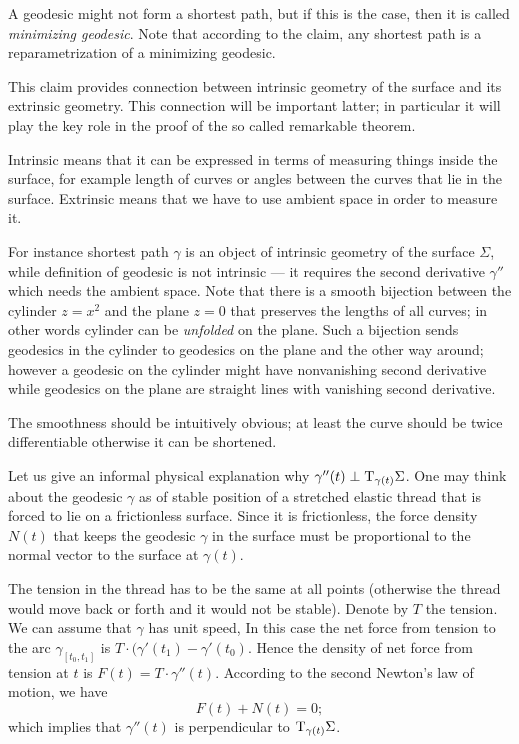 A geodesic might not form a shortest path, but if this is the case, then it is called \emph{minimizing geodesic}.
Note that according to the claim, any shortest path is a reparametrization of a minimizing geodesic.

This claim provides connection between intrinsic geometry of the surface and its extrinsic geometry.
This connection will be important latter; in particular it will play the key role in the proof of the so called remarkable theorem. %

Intrinsic means that it can be expressed in terms of measuring things inside the surface, for example length of curves or angles between the curves that lie in the surface.
Extrinsic means that we have to use ambient space in order to measure it.

For instance shortest path $\gamma$ is an object of intrinsic geometry of the surface $\Sigma$,
while definition of geodesic is not intrinsic --- it requires the second derivative $\gamma''$ which needs the ambient space.
Note that there is a smooth bijection between the cylinder $z=x^2$ and the plane $z=0$ that preserves the lengths of all curves; in other words cylinder can be \emph{unfolded} on the plane.
Such a bijection sends geodesics in the cylinder to geodesics on the plane and the other way around; however a geodesic on the cylinder might have nonvanishing second derivative while geodesics on the plane are straight lines with vanishing second derivative.



The smoothness should be intuitively obvious; at least the curve should be twice differentiable otherwise it can be shortened.

Let us give an informal physical explanation why $\gamma''(t)\perp\mathrm{T}_{\gamma(t)}\Sigma$.
One may think about the geodesic $\gamma$ as of stable position of a stretched elastic thread that is forced to lie on a frictionless surface.
Since it is frictionless, the force density $N(t)$ that keeps the geodesic $\gamma$ in the surface must be proportional to the normal vector to the surface at $\gamma(t)$.

The tension in the thread has to be the same at all points (otherwise the thread would move back or forth and it would not be stable).
Denote by $T$ the tension.
We can assume that $\gamma$ has unit speed,
In this case the net force from tension to the arc $\gamma_{[t_0,t_1]}$ is $T\cdot(\gamma'(t_1)-\gamma'(t_0)$.
Hence the density of net force from tension at $t$ is $F(t)=T\cdot\gamma''(t)$.
According to the second Newton's law of motion, we have 
\[F(t)+N(t)=0;\]
which implies that  $\gamma''(t)$ is perpendicular to $\mathrm{T}_{\gamma(t)}\Sigma$.

